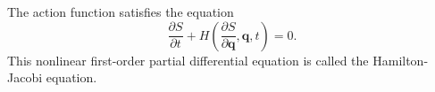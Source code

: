 The action function satisfies the equation
$$\frac{\partial S}{\partial t} + H\left( \frac{\partial S}{\partial \mathbf{q}}, \mathbf{q}, t \right) = 0.$$
This nonlinear first-order partial differential equation is called the Hamilton-Jacobi equation.
